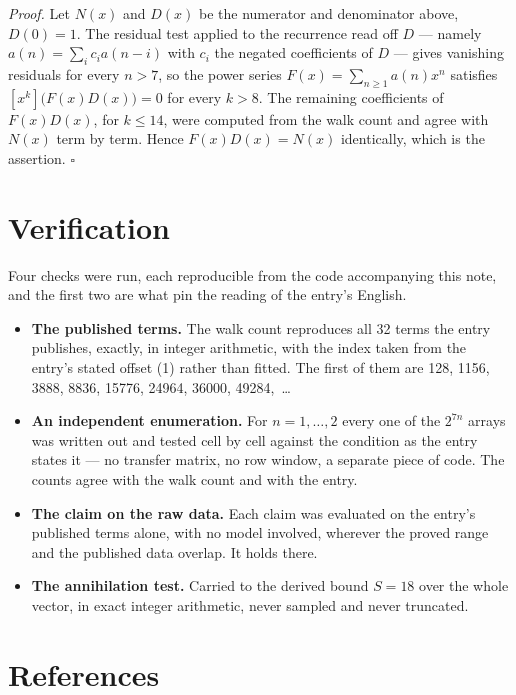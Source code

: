 \documentclass[11pt]{article}
\theoremstyle{definition}
\begin{document}
{\itshape Proof.} Let $N(x)$ and $D(x)$ be the numerator and denominator above, $D(0)=1$. The residual test applied to the recurrence read off $D$ --- namely $a(n) = \sum_i c_i a(n-i)$ with $c_i$ the negated coefficients of $D$ --- gives vanishing residuals for every $n > 7$, so the power series $F(x)=\sum_{n\ge 1}a(n)x^n$ satisfies $[x^k]\bigl(F(x)D(x)\bigr) = 0$ for every $k > 8$. The remaining coefficients of $F(x)D(x)$, for $k \le 14$, were computed from the walk count and agree with $N(x)$ term by term. Hence $F(x)D(x) = N(x)$ identically, which is the assertion. $\square$

\section{Verification}

Four checks were run, each reproducible from the code accompanying this note, and the first two are what pin the reading of the entry's English.

\begin{itemize}

\item {\bfseries The published terms.} The walk count reproduces all 32 terms the entry publishes, exactly, in integer arithmetic, with the index taken from the entry's stated offset (1) rather than fitted. The first of them are 128, 1156, 3888, 8836, 15776, 24964, 36000, 49284,~\dots

\item {\bfseries An independent enumeration.} For $n = 1,\dots,2$ every one of the $2^{7n}$ arrays was written out and tested cell by cell against the condition as the entry states it --- no transfer matrix, no row window, a separate piece of code. The counts agree with the walk count and with the entry.

\item {\bfseries The claim on the raw data.} Each claim was evaluated on the entry's published terms alone, with no model involved, wherever the proved range and the published data overlap. It holds there.

\item {\bfseries The annihilation test.} Carried to the derived bound $S = 18$ over the whole vector, in exact integer arithmetic, never sampled and never truncated.

\end{itemize}

\section{References}
\end{document}
